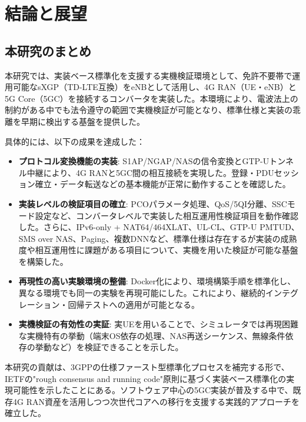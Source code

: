 \chapter{結論と展望}
\label{chap:conclusion}

\section{本研究のまとめ}
本研究では、実装ベース標準化を支援する実機検証環境として、免許不要帯で運用可能なsXGP（TD-LTE互換）をeNBとして活用し、4G RAN（UE・eNB）と5G Core（5GC）を接続するコンバータを実装した。本環境により、電波法上の制約がある中でも法令遵守の範囲で実機検証が可能となり、標準仕様と実装の乖離を早期に検出する基盤を提供した。

具体的には、以下の成果を達成した：

\begin{itemize}
	\item \textbf{プロトコル変換機能の実装}: S1AP/NGAP/NASの信令変換とGTP-Uトンネル中継により、4G RANと5GC間の相互接続を実現した。登録・PDUセッション確立・データ転送などの基本機能が正常に動作することを確認した。

	\item \textbf{実装レベルの検証項目の確立}: PCOパラメータ処理、QoS/5QI分離、SSCモード設定など、コンバータレベルで実装した相互運用性検証項目を動作確認した。さらに、IPv6-only + NAT64/464XLAT、UL-CL、GTP-U PMTUD、SMS over NAS、Paging、複数DNNなど、標準仕様は存在するが実装の成熟度や相互運用性に課題がある項目について、実機を用いた検証が可能な基盤を構築した。

	\item \textbf{再現性の高い実験環境の整備}: Docker化により、環境構築手順を標準化し、異なる環境でも同一の実験を再現可能にした。これにより、継続的インテグレーション・回帰テストへの適用が可能となる。

	\item \textbf{実機検証の有効性の実証}: 実UEを用いることで、シミュレータでは再現困難な実機特有の挙動（端末OS依存の処理、NAS再送シーケンス、無線条件依存の挙動など）を検証できることを示した。
\end{itemize}

本研究の貢献は、3GPPの仕様ファースト型標準化プロセスを補完する形で、IETFの"rough consensus and running code"原則に基づく実装ベース標準化の実現可能性を示したことにある。ソフトウェア中心の5GC実装が普及する中で、既存4G RAN資産を活用しつつ次世代コアへの移行を支援する実践的アプローチを確立した。

